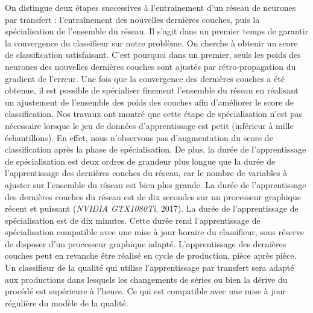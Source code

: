 On distingue deux étapes successives à l'entrainement d'un réseau de neurones par transfert : l'entraînement des nouvelles dernières couches, puis la spécialisation de l'ensemble du réseau.
Il s'agit dans un premier temps de garantir la convergence du classifieur sur notre problème.
On cherche à obtenir un score de classification satisfaisant.
C'est pourquoi dans un premier, seuls les poids des neurones des nouvelles dernières couches sont ajustés par rétro-propagation du gradient de l'erreur.
Une fois que la convergence des dernières couches a été obtenue, il est possible de spécialiser finement l'ensemble du réseau en réalisant un ajustement de l'ensemble des poids des couches afin d'améliorer le score de classification.
Nos travaux ont montré que cette étape de spécialisation n'est pas nécessaire lorsque le jeu de données d'apprentissage est petit (inférieur à mille échantillons).
En effet, nous n'observons pas d'augmentation du score de classification après la phase de spécialisation.
De plus, la durée de l'apprentissage de spécialisation est deux ordres de grandeur plus longue que la durée de l'apprentissage des dernières couches du réseau, car le nombre de variables à ajuster sur l'ensemble du réseau est bien plus grande.
La durée de l'apprentissage des dernières couches du réseau est de dix secondes sur un processeur graphique récent et puissant (\textit{NVIDIA GTX1080Ti}, 2017).
La durée de l'apprentissage de spécialisation est de dix minutes.
Cette durée rend l'apprentissage de spécialisation compatible avec une mise à jour horaire du classifieur, sous réserve de disposer d'un processeur graphique adapté. L'apprentissage des dernières couches peut en revanche être réalisé en cycle de production, pièce après pièce.
Un classifieur de la qualité qui utilise l'apprentissage par transfert sera adapté aux productions dans lesquels les changements de séries ou bien la dérive du procédé est supérieure à l'heure. Ce qui est compatible avec une mise à jour régulière du modèle de la qualité.

